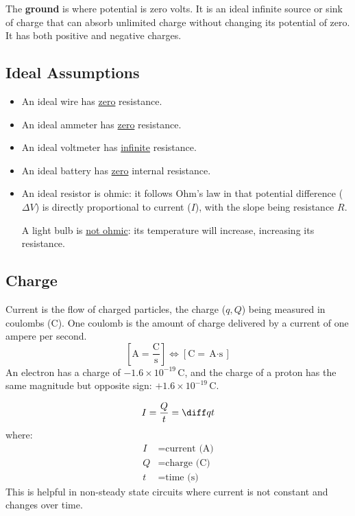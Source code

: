 \documentclass{article}
\newcommand{\definition}[1]{\begin{tcolorbox}[colback=red!5!white,colframe=red!75!black,parbox=false] #1 \end{tcolorbox}}
\newcommand{\theorem}[2]{\begin{tcolorbox}[title={#1},colback=blue!5!white,colframe=blue!75!black,parbox=false] #2 \end{tcolorbox}}
\begin{document}
\definition{The \textbf{ground} is where potential is zero volts. It is an ideal infinite source or sink of charge that can absorb unlimited charge without changing its potential of zero. It has both positive and negative charges.}

\subsection{Ideal Assumptions}

\begin{itemize}
	\item An ideal wire has \ul{zero} resistance.
	\item An ideal ammeter has \ul{zero} resistance.
	\item An ideal voltmeter has \ul{infinite} resistance.
	\item An ideal battery has \ul{zero} internal resistance.
	\item An ideal resistor is ohmic: it follows Ohm's law in that potential difference ($\Delta V$) is directly proportional to current ($I$), with the slope being resistance $R$.

	A light bulb is \ul{not ohmic}: its temperature will increase, increasing its resistance.
\end{itemize}

\subsection{Charge}

Current is the flow of charged particles, the charge ($q,Q$) being measured in coulombs (C). One coulomb is the amount of charge delivered by a current of one ampere per second.
\begin{equation*}
	\left[ \si{\ampere}=\frac{\si{\coulomb}}{\si{\second}} \right]
	\iff
	\left[ \si{\coulomb}=\si{\ampere\cdot\second} \right]
\end{equation*}
An electron has a charge of $-1.6\times 10^{-19}\,\si{\coulomb}$, and the charge of a proton has the same magnitude but opposite sign: $+1.6\times 10^{-19}\,\si{\coulomb}$.

\theorem{Charge and current}{
	\begin{equation*}
	    I=\frac{Q}{t}=\diff qt
	\end{equation*}
	where:
	\begin{align*}
		I&=\text{current (A)} \\
		Q&=\text{charge (C)} \\
		t&=\text{time (s)}
	\end{align*}
	This is helpful in non-steady state circuits where current is not constant and changes over time.
}
\end{document}
